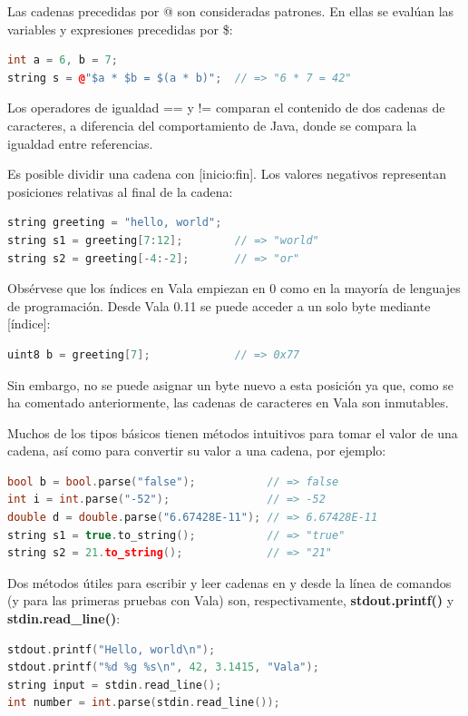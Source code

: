 \documentclass[12pt,twoside]{book}
\begin{document}
Las cadenas precedidas por @ son consideradas patrones. En ellas se evalúan las variables y expresiones precedidas por \$:

\begin{lstlisting}[language=C++]
int a = 6, b = 7;
string s = @"$a * $b = $(a * b)";  // => "6 * 7 = 42"
\end{lstlisting}

Los operadores de igualdad == y != comparan el contenido de dos cadenas de caracteres, a diferencia del comportamiento de Java, donde se compara la igualdad entre referencias.

Es posible dividir una cadena con [inicio:fin]. Los valores negativos representan posiciones relativas al final de la cadena:

\begin{lstlisting}[language=C++]
string greeting = "hello, world";
string s1 = greeting[7:12];        // => "world"
string s2 = greeting[-4:-2];       // => "or"
\end{lstlisting}

Obsérvese que los índices en Vala empiezan en 0 como en la mayoría de lenguajes de programación. Desde Vala 0.11 se puede acceder a un solo byte mediante [índice]:

\begin{lstlisting}[language=C++]
uint8 b = greeting[7];             // => 0x77
\end{lstlisting}

Sin embargo, no se puede asignar un byte nuevo a esta posición ya que, como se ha comentado anteriormente, las cadenas de caracteres en Vala son inmutables.

Muchos de los tipos básicos tienen métodos intuitivos para tomar el valor de una cadena, así como para convertir su valor a una cadena, por ejemplo:

\begin{lstlisting}[language=C++]
bool b = bool.parse("false");           // => false
int i = int.parse("-52");               // => -52
double d = double.parse("6.67428E-11"); // => 6.67428E-11
string s1 = true.to_string();           // => "true"
string s2 = 21.to_string();             // => "21"
\end{lstlisting}

Dos métodos útiles para escribir y leer cadenas en y desde la línea de comandos (y para las primeras pruebas con Vala) son, respectivamente, \textbf{stdout.printf()} y \textbf{stdin.read\_line()}:

\begin{lstlisting}[language=C++]
stdout.printf("Hello, world\n");
stdout.printf("%d %g %s\n", 42, 3.1415, "Vala");
string input = stdin.read_line();
int number = int.parse(stdin.read_line());
\end{lstlisting}
\end{document}
